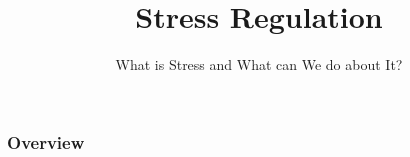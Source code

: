 \documentclass{beamer}
\begin{document}
% 


\title[Stress regulation]{Stress Regulation} %
\subtitle{What is Stress and What can We do about It?}








 \begin{frame}
\titlepage %
\end{frame}

\maketitle

\begin{frame}
\frametitle{Overview} %
\tableofcontents %
\end{frame}



\end{document}
